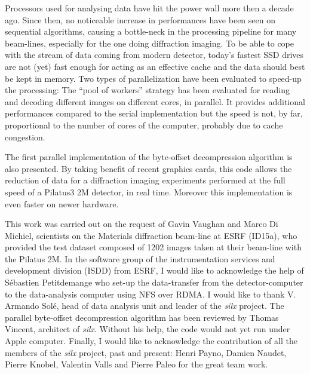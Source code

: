 \documentclass[preprint]{iucr}              %
\begin{document}
Processors used for analysing data have hit the power wall more then
a  decade ago.
Since then,  no noticeable increase in performances have been seen on
sequential algorithms, causing a bottle-neck in the processing
pipeline for many beam-lines, especially for the one doing diffraction imaging.
To be able to cope with the stream of data coming from modern detector,
today's fastest SSD drives are not (yet) fast  enough for acting as an
effective cache and the data should best be kept in memory.
Two types of parallelization have been evaluated to speed-up the processing:  
The ``pool of workers'' strategy has been evaluated for reading and decoding
different images on different cores, in parallel.
It provides additional performances compared to the serial implementation but
the speed is not, by far, proportional to the number of cores of the computer,
probably due to cache congestion.

The first parallel implementation of the byte-offset decompression 
algorithm is also presented. 
By taking benefit of recent graphics cards, this code allows the reduction
of data for a diffraction imaging experiments performed at the full speed of
a Pilatus3 2M detector, in real time. 
Moreover this implementation is even faster on newer hardware. 

 
This work was carried out on the request of Gavin Vaughan and Marco Di
Michiel, scientists on the Materials diffraction beam-line at ESRF (ID15a), who
provided the test dataset composed of 1202 images taken at their beam-line with
the Pilatus 2M.
In the software group of the instrumentation services and development division
(ISDD) from ESRF, I would like to acknowledge the help of Sébastien Petitdemange
who set-up the data-transfer from the detector-computer to the data-analysis
computer using NFS over RDMA. 
I would like to thank V. Armando Solé, head of data analysis unit and leader of
the \textit{silx} project. 
The parallel byte-offset decompression algorithm has been reviewed by Thomas
Vincent, architect of \textit{silx}. Without his help, the code would not yet
run under Apple computer.
Finally, I would like to acknowledge the contribution of all the members of
the \textit{silx} project, past and present:
Henri Payno, Damien Naudet, Pierre Knobel, Valentin Valls and
Pierre Paleo for the great team work.



\end{document}
